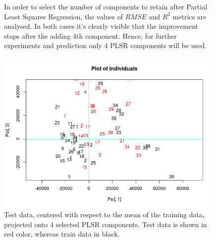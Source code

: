 \documentclass[a4,12pt]{article}
\begin{document}
    \begin{figure}[h!]
        \centering
        \caption{In order to select the number of components to retain after Partial Least Squares Regression, the values of $RMSE$ and $R^2$ metrics are analysed. In both cases it's clearly visible that the improvement stops after the adding 4th component. Hence, for further experiments and prediction only 4 PLSR components will be used.}
        \label{fig:plsr}
    \end{figure}

    \begin{figure}
        \centering
        \includegraphics[width=\linewidth]{individuals.png}
        \caption{Test data, centered with respect to the mean of the training data, projected onto 4 selected PLSR components. Test data is shown in red color, whereas train data in black.}
        \label{fig:individuals}
    \end{figure}
\end{document}

